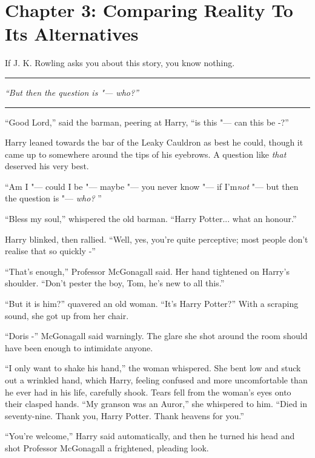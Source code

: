 \chapter{Chapter 3: Comparing Reality To Its Alternatives}
If J. K. Rowling asks you about this story, you know nothing.

\begin{center}\rule{3in}{0.4pt}\end{center}

\emph{``But then the question is "--- who?''}

\begin{center}\rule{3in}{0.4pt}\end{center}

``Good Lord,'' said the barman, peering at Harry, ``is this "--- can this
be -?''

Harry leaned towards the bar of the Leaky Cauldron as best he could,
though it came up to somewhere around the tips of his eyebrows. A
question like \emph{that} deserved his very best.

``Am I "--- could I be "--- maybe "--- you never know "--- if I'm\emph{not} "--- but
then the question is "--- \emph{who?} ''

``Bless my soul,'' whispered the old barman. ``Harry Potter... what
an honour.''

Harry blinked, then rallied. ``Well, yes, you're quite perceptive; most
people don't realise that so quickly -''

``That's enough,'' Professor McGonagall said. Her hand tightened on
Harry's shoulder. ``Don't pester the boy, Tom, he's new to all this.''

``But it is him?'' quavered an old woman. ``It's Harry Potter?'' With a
scraping sound, she got up from her chair.

``Doris -'' McGonagall said warningly. The glare she shot around the
room should have been enough to intimidate anyone.

``I only want to shake his hand,'' the woman whispered. She bent low and
stuck out a wrinkled hand, which Harry, feeling confused and more
uncomfortable than he ever had in his life, carefully shook. Tears fell
from the woman's eyes onto their clasped hands. ``My granson was an
Auror,'' she whispered to him. ``Died in seventy-nine. Thank you, Harry
Potter. Thank heavens for you.''

``You're welcome,'' Harry said automatically, and then he turned his
head and shot Professor McGonagall a frightened, pleading look.

